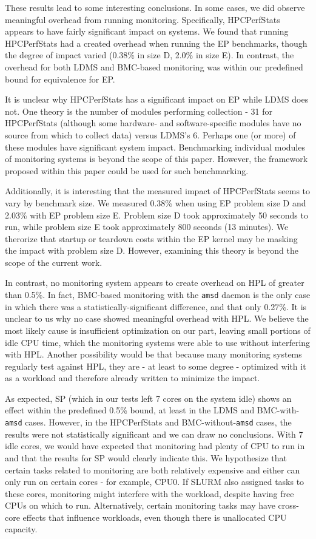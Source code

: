 \documentclass[conference]{IEEEtran}
\begin{document}
These results lead to some interesting conclusions. In some cases, we did 
observe meaningful overhead from running monitoring. Specifically, HPCPerfStats 
appears to have fairly significant impact on systems. We found that running 
HPCPerfStats had a created overhead when running 
the EP benchmarks, though the degree of impact varied (0.38\% in size D, 2.0\% in size E). 
In contrast, the overhead for both LDMS and BMC-based monitoring was within our 
predefined bound for equivalence for EP.

It is unclear why HPCPerfStats has a significant impact on EP while LDMS does not. 
One theory is the number of modules performing collection - 31 for HPCPerfStats 
(although some hardware- and software-specific modules have no source from 
which to collect data) 
versus LDMS's 6. Perhaps one (or more) of these modules have significant 
system impact. Benchmarking individual modules of monitoring systems is beyond 
the scope of this paper. However, the framework proposed within this paper 
could be used for such benchmarking.

Additionally, it is interesting that the measured impact of HPCPerfStats seems 
to vary by benchmark size. We measured 0.38\% when using EP problem size D and 
2.03\% with EP problem size E. Problem size D took approximately 50 seconds to 
run, while problem size E took approximately 800 seconds (13 minutes). We 
therorize that startup or teardown costs within the EP kernel may be masking 
the impact with problem size D. However, examining this theory is beyond the 
scope of the current work.

In contrast, no monitoring system appears to create overhead on HPL of greater 
than 0.5\%. In fact, BMC-based monitoring with the \texttt{amsd} daemon is the 
only case in which there was a statistically-significant difference, and that 
only 0.27\%. It is unclear to us why no case showed meaningful overhead with HPL. 
We believe the most likely cause is 
insufficient optimization on our part, leaving small portions of idle CPU time, 
which the monitoring systems were able to use without interfering with HPL. 
Another possibility would be that because many monitoring systems regularly 
test against HPL, they are - at least to some degree - optimized with it as a 
workload and therefore already written to minimize the impact.

As expected, SP (which in our tests left 7 cores on the system idle) shows an effect
within the predefined 0.5\% bound, at least in the LDMS and BMC-with-\texttt{amsd}
cases. However, in the HPCPerfStats and BMC-without-\texttt{amsd} cases, the results
were not statistically significant and we can draw no conclusions. With 7 idle cores,
we would have expected that monitoring had plenty of CPU to run in and that the results 
for SP would clearly indicate this. We hypothesize that certain tasks related to monitoring
are both relatively expensive and either can only run on certain cores  - for example, CPU0.
If SLURM also assigned tasks to these cores, monitoring might interfere with the 
workload, despite having free CPUs on which to run. Alternatively, certain monitoring 
tasks may have cross-core effects that influence workloads, even though there is unallocated 
CPU capacity.
\end{document}
